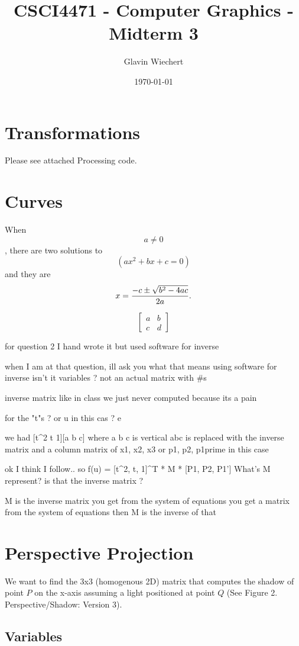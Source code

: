 \documentclass[12pt]{article}
\title{CSCI4471 - Computer Graphics - Midterm 3}
\author{Glavin Wiechert}
\date{\today}
\begin{document}
\maketitle

\section{Transformations}

Please see attached Processing code.

\section{Curves}

When $$a \ne 0$$, there are two solutions to $$(ax^2 + bx + c = 0)$$ and they are
$$x = {-c \pm \sqrt{b^2-4ac} \over 2a}.$$


$$\begin{bmatrix}a & b\\c & d\end{bmatrix}$$


for question 2 I hand wrote it but used software for inverse

when I am at that question, ill ask you what that means
using software for inverse
isn't it variables ?
not an actual matrix with #s

inverse matrix
like in class
we just never computed
because its a pain

for the "t"s ?
or u in this cas ?
e

we had [t^2 t 1][a b c]
where a b c is vertical
abc is replaced with the inverse matrix and a column matrix of x1, x2, x3
or p1, p2, p1prime in this case

ok I think I follow.. so
f(u) = [t^2, t, 1]^T * M * [P1, P2, P1']
What's M represent? is that the inverse matrix ?

M is the inverse matrix you get from the system of equations
you get a matrix from the system of equations
then M is the inverse of that


\section{Perspective Projection}

We want to find the 3x3 (homogenous 2D) matrix that 
computes the shadow of point $P$ on the x-axis assuming 
a light positioned at point $Q$ 
(See Figure 2. Perspective/Shadow: Version 3).

\subsection{Variables}
\end{document}
